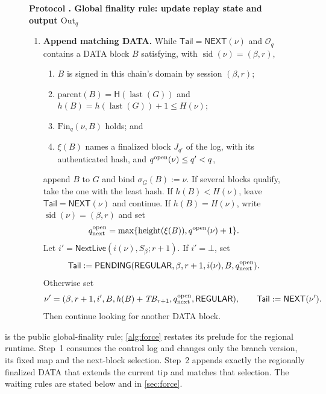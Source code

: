 \documentclass[11pt,a4paper]{article}
\newcommand{\Hash}{\mathsf H}
\newcommand{\TB}{\mathit{TB}}
\newcommand{\tagg}[1]{\ensuremath{\mathsf{#1}}}
\newcounter{protocol}
\newenvironment{protocol}[3][htbp]{\begin{figure}[#1]\refstepcounter{protocol}\label{#2}
\begin{mdframed}[linewidth=.6pt,skipabove=0pt,skipbelow=0pt,
innertopmargin=7pt,innerbottommargin=7pt]\small
\textbf{Protocol \theprotocol. #3}\par\smallskip}{\end{mdframed}\end{figure}}
\begin{document}
\begin{protocol}[H]{alg:global-rule}{Global finality rule: update replay state and output $\mathrm{Out}_q$}
\begin{enumerate}[label=\textbf{\arabic*)},itemsep=3pt]
\item \textbf{Append matching DATA.}
While $\mathsf{Tail}=\tagg{NEXT}(\nu)$ and $\mathcal O_q$ contains a
DATA block $B$ satisfying, with
$\operatorname{sid}(\nu)=(\beta,r)$,
  \begin{enumerate}[label=(\alph*),itemsep=1pt]
  \item $B$ is signed in this chain's domain by session $(\beta,r)$;
  \item $\mathrm{parent}(B)=\Hash(\operatorname{last}(G))$ and
  $h(B)=h(\operatorname{last}(G))+1\le H(\nu)$;
  \item $\mathrm{Fin}_q(\nu,B)$ holds; and
  \item $\xi(B)$ names a finalized block $J_{q'}$ of the log, with its
  authenticated hash, and $q^{\rm open}(\nu)\le q'<q$,
  \end{enumerate}
append $B$ to $G$ and bind $\sigma_G(B):=\nu$.  If several blocks
qualify, take the one with the least hash.  If $h(B)<H(\nu)$, leave
$\mathsf{Tail}=\tagg{NEXT}(\nu)$ and continue.  If $h(B)=H(\nu)$, write
$\operatorname{sid}(\nu)=(\beta,r)$ and set
\[
 q^{\rm open}_{\rm next}=
 \max\{\operatorname{height}(\xi(B)),q^{\rm open}(\nu)+1\}.
\]
Let $i'=\tagg{NextLive}(i(\nu),S_\beta;r+1)$. If $i'=\bot$, set
\[
 \mathsf{Tail}:=\tagg{PENDING}
 (\tagg{REGULAR},\beta,r+1,i(\nu),B,q^{\rm open}_{\rm next}).
\]
Otherwise set
\[
 \nu'=(\beta,r+1,i',B,h(B)+\TB_{r+1},
       q^{\rm open}_{\rm next},\tagg{REGULAR}),
 \qquad \mathsf{Tail}:=\tagg{NEXT}(\nu').
\]
Then continue looking for another DATA block.
\end{enumerate}
\end{protocol}

 is the public global-finality rule;
\cref{alg:force} restates its prelude for the regional runtime. Step~1 consumes the control log and changes only the
branch version, its fixed map and the next-block selection. Step~2
appends exactly the regionally finalized DATA that extends the current
tip and matches that selection. The waiting rules are stated below and
in \cref{sec:force}.
\end{document}
